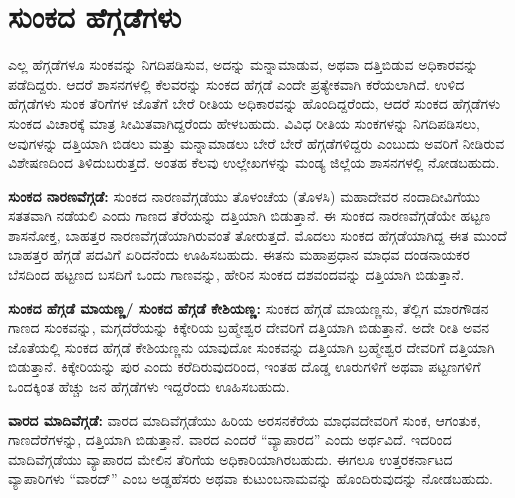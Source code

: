 \section*{ಸುಂಕದ ಹೆಗ್ಗಡೆಗಳು}

ಎಲ್ಲ ಹೆಗ್ಗಡೆಗಳೂ ಸುಂಕವನ್ನು ನಿಗದಿಪಡಿಸುವ, ಅದನ್ನು ಮನ್ನಾಮಾಡುವ, ಅಥವಾ ದತ್ತಿಬಿಡುವ ಅಧಿಕಾರವನ್ನು ಪಡೆದಿದ್ದರು. ಆದರೆ ಶಾಸನಗಳಲ್ಲಿ ಕೆಲವರನ್ನು ಸುಂಕದ ಹೆಗ್ಗಡೆ ಎಂದೇ ಪ್ರತ್ಯೇಕವಾಗಿ ಕರೆಯಲಾಗಿದೆ. ಉಳಿದ ಹೆಗ್ಗಡೆಗಳು ಸುಂಕ ತೆರಿಗೆಗಳ ಜೊತೆಗೆ ಬೇರೆ ರೀತಿಯ ಅಧಿಕಾರವನ್ನು ಹೊಂದಿದ್ದರೆಂದು, ಆದರೆ ಸುಂಕದ ಹೆಗ್ಗಡೆಗಳು ಸುಂಕದ ವಿಚಾರಕ್ಕೆ ಮಾತ್ರ ಸೀಮಿತವಾಗಿದ್ದರೆಂದು ಹೇಳಬಹುದು. ವಿವಿಧ ರೀತಿಯ ಸುಂಕಗಳನ್ನು ನಿಗದಿಪಡಿಸಲು, ಅವುಗಳನ್ನು ದತ್ತಿಯಾಗಿ ಬಿಡಲು ಮತ್ತು ಮನ್ನಾಮಾಡಲು ಬೇರೆ ಬೇರೆ ಹೆಗ್ಗಡೆಗಳಿದ್ದರು ಎಂಬುದು ಅವರಿಗೆ ನೀಡಿರುವ ವಿಶೇಷಣದಿಂದ ತಿಳಿದುಬರುತ್ತದೆ. ಅಂತಹ ಕೆಲವು ಉಲ್ಲೇಖಗಳನ್ನು ಮಂಡ್ಯ ಜಿಲ್ಲೆಯ ಶಾಸನಗಳಲ್ಲಿ ನೋಡಬಹುದು.

\textbf{ಸುಂಕದ ನಾರಣವೆಗ್ಗಡೆ:} ಸುಂಕದ ನಾರಣವೆಗ್ಗಡೆಯು ತೊಳಂಚೆಯ (ತೊಳಸಿ) ಮಹಾದೇವರ ನಂದಾದೀವಿಗೆಯು ಸತತವಾಗಿ ನಡೆಯಲಿ ಎಂದು ಗಾಣದ ತೆರೆಯನ್ನು ದತ್ತಿಯಾಗಿ ಬಿಡುತ್ತಾನೆ. ಈ ಸುಂಕದ ನಾರಣವೆಗ್ಗಡೆಯೇ ಹಟ್ಟಣ ಶಾಸನೋಕ್ತ, ಬಾಹತ್ತರ ನಾರಣವೆಗ್ಗಡೆಯಾಗಿರುವಂತೆ ತೋರುತ್ತದೆ. ಮೊದಲು ಸುಂಕದ ಹೆಗ್ಗಡೆಯಾಗಿದ್ದ ಈತ ಮುಂದೆ ಬಾಹತ್ತರ ಹೆಗ್ಗಡೆ ಪದವಿಗೆ ಏರಿದನೆಂದು ಊಹಿಸಬಹುದು. ಈತನು ಮಹಾಪ್ರಧಾನ ಮಾಧವ ದಂಡನಾಯಕರ ಬೆಸದಿಂದ ಹಟ್ಟಣದ ಬಸದಿಗೆ ಒಂದು ಗಾಣವನ್ನು, ಹೇರಿನ ಸುಂಕದ ದಶವಂದವನ್ನು ದತ್ತಿಯಾಗಿ ಬಿಡುತ್ತಾನೆ.

\textbf{ಸುಂಕದ ಹೆಗ್ಗಡೆ ಮಾಯಣ್ಣ/ ಸುಂಕದ ಹೆಗ್ಗಡೆ ಕೇಶಿಯಣ್ಣ:} ಸುಂಕದ ಹೆಗ್ಗಡೆ ಮಾಯಣ್ಣನು, ತೆಲ್ಲಿಗ ಮಾರಗೌಡನ ಗಾಣದ ಸುಂಕವನ್ನು, ಮಗ್ಗದೆರೆಯನ್ನು ಕಿಕ್ಕೇರಿಯ ಬ್ರಹ್ಮೇಶ್ವರ ದೇವರಿಗೆ ದತ್ತಿಯಾಗಿ ಬಿಡುತ್ತಾನೆ. ಅದೇ ರೀತಿ ಅವನ ಜೊತೆಯಲ್ಲಿ ಸುಂಕದ ಹೆಗ್ಗಡೆ ಕೇಶಿಯಣ್ಣನು ಯಾವುದೋ ಸುಂಕವನ್ನು ದತ್ತಿಯಾಗಿ ಬ್ರಹ್ಮೇಶ್ವರ ದೇವರಿಗೆ ದತ್ತಿಯಾಗಿ ಬಿಡುತ್ತಾನೆ. ಕಿಕ್ಕೇರಿಯನ್ನು ಪುರ ಎಂದು ಕರೆದಿರುವುದರಿಂದ, ಇಂತಹ ದೊಡ್ಡ ಊರುಗಳಿಗೆ ಅಥವಾ ಪಟ್ಟಣಗಳಿಗೆ ಒಂದಕ್ಕಿಂತ ಹೆಚ್ಚು ಜನ ಹೆಗ್ಗಡೆಗಳು ಇದ್ದರೆಂದು ಊಹಿಸಬಹುದು.

\textbf{ವಾರದ ಮಾದಿವೆಗ್ಗಡೆ:} ವಾರದ ಮಾದಿವೆಗ್ಗಡೆಯು ಹಿರಿಯ ಅರಸನಕೆರೆಯ ಮಾಧವದೇವರಿಗೆ ಸುಂಕ, ಆಗಂತುಕ, ಗಾಣದೆರೆಗಳನ್ನು, ದತ್ತಿಯಾಗಿ ಬಿಡುತ್ತಾನೆ. ವಾರದ ಎಂದರೆ “ವ್ಯಾಪಾರದ” ಎಂದು ಅರ್ಥವಿದೆ. ಇದರಿಂದ ಮಾದಿವೆಗ್ಗಡೆಯು ವ್ಯಾಪಾರದ ಮೇಲಿನ ತೆರಿಗೆಯ ಅಧಿಕಾರಿಯಾಗಿರಬಹುದು. ಈಗಲೂ ಉತ್ತರಕರ್ನಾಟದ ವ್ಯಾಪಾರಿಗಳು “ವಾರದ್​” ಎಂಬ ಅಡ್ಡಹೆಸರು ಅಥವಾ ಕುಟುಂಬನಾಮವನ್ನು ಹೊಂದಿರುವುದನ್ನು ನೋಡಬಹುದು.

